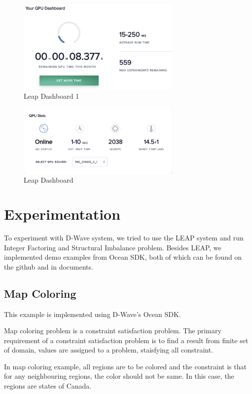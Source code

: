 \documentclass[12pt,conference]{IEEEtran}
\begin{document}
\begin{figure}[h]
  \centering
  \includegraphics[width=8cm]{Leap-db1.png}
  \caption{Leap Dashboard 1}
  \label{fig:LDB}
\end{figure}

\begin{figure}[H]
  \centering
  \includegraphics[width=8cm]{Leap-db2.png}
  \caption{Leap Dashboard}
  \label{fig:LDB2}
\end{figure}



\section{Experimentation}
To experiment with D-Wave system, we tried to use the LEAP system and run Integer Factoring and Structural Imbalance problem. Besides LEAP, we implemented demo examples from Ocean SDK, both of which can be found on the github\cite{6} and in documents\cite{7}.


\subsection{Map Coloring}
This example is implemented using D-Wave's Ocean SDK. 

Map coloring problem is a constraint satisfaction problem. The primary requirement of a constraint satisfaction problem is to find a result from finite set of domain, values are assigned to a problem, staisfying all constraint. 

In map coloring example, all regions are to be colored and the constraint is that for any neighbouring regions, the color should not be same. In this case, the regions are states of Canada.
\end{document}
